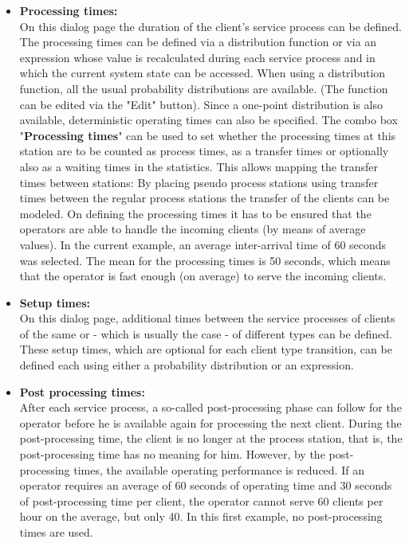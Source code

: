 \documentclass{svmono}
\begin{document}
\begin{itemize}
\item
\textbf{Processing times:}\\
On this dialog page the duration of the client’s service process can be defined. The processing times can be defined via a distribution function or via an expression whose value is recalculated during each service process and in which the current system state can be accessed. When using a distribution function, all the usual probability distributions are available. (The function can be edited via the "Edit" button). Since a one-point distribution is also available, deterministic operating times can also be specified. The combo box "\textbf{Processing times}" can be used to set whether the processing times at this station are to be counted as process times, as a transfer times or optionally also as a waiting times in the statistics. This allows mapping the transfer times between stations: By placing pseudo process stations using transfer times between the regular process stations the transfer of the clients can be modeled. On defining the processing times it has to be ensured that the operators are able to handle the incoming clients (by means of average values). In the current example, an average inter-arrival time of 60 seconds was selected. The mean for the processing times is 50 seconds, which means that the operator is fast enough (on average) to serve the incoming clients.
\item
\textbf{Setup times:}\\
On this dialog page, additional times between the service processes of clients of the same or - which is usually the case - of different types can be defined. These setup times, which are optional for each client type transition, can be defined each using either a probability distribution or an expression.
\item
\textbf{Post processing times:}\\
After each service process, a so-called post-processing phase can follow for the operator before he is available again for processing the next client. During the post-processing time, the client is no longer at the process station, that is, the post-processing time has no meaning for him. However, by the post-processing times, the available operating performance is reduced. If an operator requires an average of 60 seconds of operating time and 30 seconds of post-processing time per client, the operator cannot serve 60 clients per hour on the average, but only 40. In this first example, no post-processing times are used.

\end{itemize}
\end{document}
